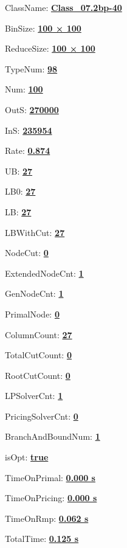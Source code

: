 \documentclass[11pt]{article}
\begin{document}
\pagestyle{empty}


ClassName: \underline{\textbf{Class_07.2bp-40}}
\par
BinSize: \underline{\textbf{100 × 100}}
\par
ReduceSize: \underline{\textbf{100 × 100}}
\par
TypeNum: \underline{\textbf{98}}
\par
Num: \underline{\textbf{100}}
\par
OutS: \underline{\textbf{270000}}
\par
InS: \underline{\textbf{235954}}
\par
Rate: \underline{\textbf{0.874}}
\par
UB: \underline{\textbf{27}}
\par
LB0: \underline{\textbf{27}}
\par
LB: \underline{\textbf{27}}
\par
LBWithCut: \underline{\textbf{27}}
\par
NodeCut: \underline{\textbf{0}}
\par
ExtendedNodeCnt: \underline{\textbf{1}}
\par
GenNodeCnt: \underline{\textbf{1}}
\par
PrimalNode: \underline{\textbf{0}}
\par
ColumnCount: \underline{\textbf{27}}
\par
TotalCutCount: \underline{\textbf{0}}
\par
RootCutCount: \underline{\textbf{0}}
\par
LPSolverCnt: \underline{\textbf{1}}
\par
PricingSolverCnt: \underline{\textbf{0}}
\par
BranchAndBoundNum: \underline{\textbf{1}}
\par
isOpt: \underline{\textbf{true}}
\par
TimeOnPrimal: \underline{\textbf{0.000 s}}
\par
TimeOnPricing: \underline{\textbf{0.000 s}}
\par
TimeOnRmp: \underline{\textbf{0.062 s}}
\par
TotalTime: \underline{\textbf{0.125 s}}
\par
\newpage


\end{document}

